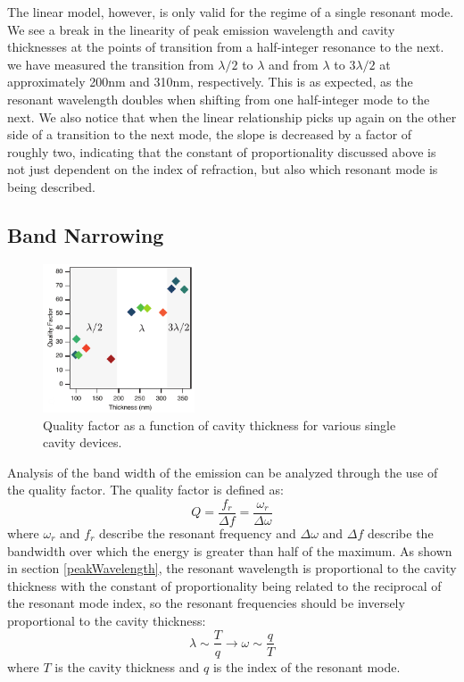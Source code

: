 \documentclass{report}
\begin{document}
            The linear model, however, is only valid for the regime of a single resonant mode. We see a break in the linearity of peak emission wavelength and cavity thicknesses at the points of transition from a half-integer resonance to the next. we have measured the transition from $\lambda/2$ to $\lambda$ and from $\lambda$ to $3\lambda/2$ at approximately 200nm and 310nm, respectively. This is as expected, as the resonant wavelength doubles when shifting from one half-integer mode to the next. We also notice that when the linear relationship picks up again on the other side of a transition to the next mode, the slope is decreased by a factor of roughly two, indicating that the constant of proportionality discussed above is not just dependent on the index of refraction, but also which resonant mode is being described.
        
        \subsection{Band Narrowing} \label{bandwidth}
            \begin{figure}
                \centering
                \includegraphics[width=0.4\textwidth]{images/n1_quality_factor.png}
                \caption{\small Quality factor as a function of cavity thickness for various single cavity devices.}
                \label{fig:bandwidth}
            \end{figure}

            Analysis of the band width of the emission can be analyzed through the use of the quality factor. The quality factor is defined as:
            \begin{equation}
                Q=\frac{f_r}{\Delta f}=\frac{\omega_r}{\Delta\omega}
            \end{equation}
            where $\omega_r$ and $f_r$ describe the resonant frequency and $\Delta\omega$ and $\Delta f$ describe the bandwidth over which the energy is greater than half of the maximum. As shown in section \ref{peakWavelength}, the resonant wavelength is proportional to the cavity thickness with the constant of proportionality being related to the reciprocal of the resonant mode index, so the resonant frequencies should be inversely proportional to the cavity thickness:
            \begin{equation}
                \lambda\sim\frac{T}{q} \rightarrow \omega\sim\frac{q}{T}
            \end{equation}
            where $T$ is the cavity thickness and $q$ is the index of the resonant mode.
\end{document}
